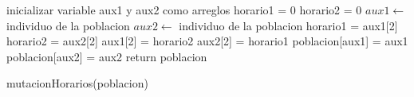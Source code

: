 \begin{algorithm}[H]
	\DontPrintSemicolon
	\SetAlgoLined
	inicializar variable aux1 y aux2 como arreglos\;
	horario1 = 0\;
	horario2 = 0\;
	$aux1 \leftarrow $ individuo de la poblacion\;
	$aux2 \leftarrow $ individuo de la poblacion\;
	horario1 = aux1[2]\;
	horario2 = aux2[2]\;
	aux1[2] = horario2\;
	aux2[2] = horario1\;
	poblacion[aux1] = aux1\;
	poblacion[aux2] = aux2\;
	return poblacion \;
	\caption{mutacionHorarios(poblacion)}
	\end{algorithm}  